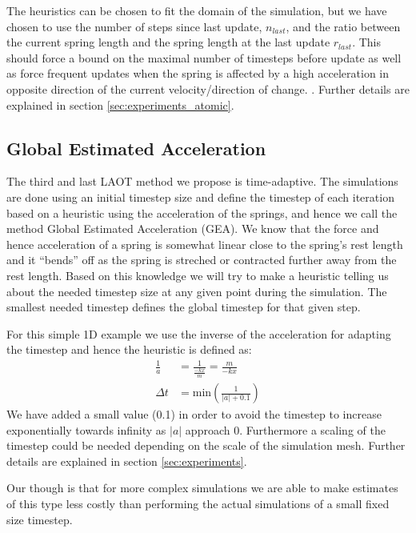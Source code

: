 \documentclass[11pt]{article}
\providecommand{\abs}[1]{\left \lvert #1 \right \rvert}
\begin{document}
The heuristics can be chosen to fit the domain of the simulation, but we have
chosen to use the number of steps since last update, $n_{last}$, and the ratio
between the current spring length and the spring length at the last update
$r_{last}$. This should force a bound on the maximal number of timesteps
before update as well as force frequent updates when the spring is affected by a
high acceleration in opposite direction of the current velocity/direction of
change. . Further details are explained in
section \ref{sec:experiments_atomic}.

\subsection{Global Estimated Acceleration}
The third and last LAOT method we propose is time-adaptive. The simulations are
done using an initial timestep size and define the timestep of each iteration
based on a heuristic using the acceleration of the springs, and hence we call
the method Global Estimated Acceleration (GEA). We know that the force and hence
acceleration of a spring is somewhat linear close to the spring's rest length
and it ``bends'' off as the spring is streched or contracted further away from
the rest length. Based on this knowledge we will try to make a heuristic
telling us about the needed timestep size at any given point during the
simulation. The smallest needed timestep defines the global timestep for that
given step.

For this simple 1D example we use the inverse of the acceleration
for adapting the timestep and hence the heuristic is defined as:
\begin{align}
    \frac{1}{a} &= \frac{1}{\frac{-kx}{m}} = \frac{m}{-kx} \\
    \label{eq:inverse}
    \Delta t &= \text{min}\left( \frac{1}{\abs{a} + 0.1} \right )
\end{align}
We have added a small value (0.1) in order to avoid the timestep to increase
exponentially towards infinity as $\abs{a}$ approach 0. Furthermore a scaling
of the timestep could be needed depending on the scale of the simulation mesh.
Further details are explained in section \ref{sec:experiments}.

Our though is that for more
complex simulations we are able to make estimates of this type less costly than
performing the actual simulations of a small fixed size timestep.

\end{document}
